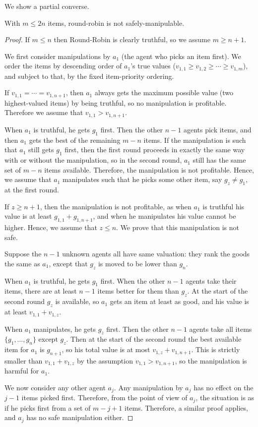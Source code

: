 We show a partial converse.
\begin{lemma}
    With $m \leq 2n$ items, round-robin is not safely-manipulable.
\end{lemma}


\begin{proof}
If $m\leq n$ then Round-Robin is clearly truthful, so we assume $m\geq n+1$.

We first consider manipulations by $a_1$ (the agent who picks an item first).
We order the items by descending order of $a_1$'s true values ($v_{1,1} \geq v_{1,2} \geq \cdots \geq v_{1,m}$), and subject to that, by the fixed item-priority ordering.

If $v_{1,1} = \cdots = v_{1,n+1}$, then $a_1$ always gets the maximum possible value (two highest-valued items) by being truthful, so no manipulation is profitable. Therefore we assume that $v_{1,1} > v_{1,n+1}$.

When $a_1$ is truthful, he gets $g_1$ first. Then the other $n-1$ agents pick items, and then $a_1$ gets the best of the remaining $m-n$ items.
If the manipulation is such that 
$a_1$ still gets $g_1$ first, then the first round proceeds in exactly the same way with or without the manipulation, so in the second round, $a_1$ still has the same set of $m-n$ items available. Therefore, the manipulation is not profitable.
Hence, we assume that $a_1$ manipulates such that
he picks some other item, say $g_z\neq g_1$, at the first round. 

If $z\geq n+1$, then the manipulation is not profitable, as when $a_1$ is truthful his value is at least $g_{1,1}+g_{1,n+1}$, and when he manipulates his value cannot be higher. Hence, we assume that $z\leq n$. We prove that this manipulation is not safe.

Suppose the $n-1$ unknown agents all have same valuation: they rank the goods the same as $a_1$, except that $g_z$ is moved to be lower than $g_{n}$.

When $a_1$ is truthful, he gets $g_1$ first. 
When the other $n-1$ agents take their items, there are at least $n-1$ items better for them than $g_z$. At the start of the second round $g_z$ is available, so $a_1$ gets an item at least as good, and his value is at least $v_{1,1} + v_{1,z}$.

When $a_1$ manipulates, he gets $g_z$ first. 
Then the other $n-1$ agents take all items $\{g_1,\ldots,g_n\}$ except $g_z$. Then at the start of the second round the best available item for $a_1$ is $g_{n+1}$, so his total value is at most $v_{1,z}+v_{1,n+1}$. This is strictly smaller than $v_{1,1} + v_{1,z}$ by the assumption $v_{1,1}>v_{1,n+1}$, so the manipulation is harmful for $a_1$.

We now consider any other agent $a_j$. Any manipulation by $a_j$ has no effect on the $j-1$ items picked first. Therefore, from the point of view of $a_j$, the situation is as if he picks first from a set of $m-j+1$ items. Therefore, a similar proof applies, and $a_j$ has no safe manipulation either.
\end{proof}

